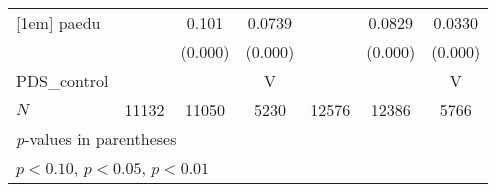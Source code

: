 \documentclass[11pt, letterpaper]{article}
\begin{document}
{\begin{tabular}{l*{6}{c}}
[1em]
paedu       &                     &       0.101\sym{***}&      0.0739\sym{***}&                     &      0.0829\sym{***}&      0.0330\sym{***}\\
            &                     &     (0.000)         &     (0.000)         &                     &     (0.000)         &     (0.000)         \\
[1em]
PDS\_control  &                     &                    &      V             &                   &                 &      V \\
\hline
\(N\)       &       11132         &       11050         &        5230         &       12576         &       12386         &        5766         \\
\hline\hline
\multicolumn{7}{l}{\footnotesize \textit{p}-values in parentheses}\\
\multicolumn{7}{l}{\footnotesize \sym{*} \(p<0.10\), \sym{**} \(p<0.05\), \sym{***} \(p<0.01\)}\\
\end{tabular}
}
\end{document}
